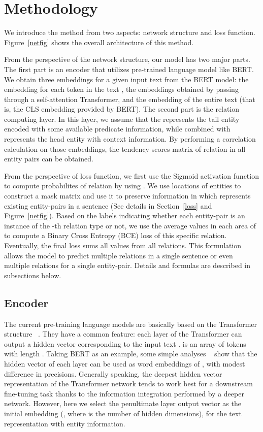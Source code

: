 \documentclass[11pt,a4paper]{article}
\begin{document}
\section{Methodology}
\label{method}

We introduce the method from two aspects: network structure and loss function.
Figure~\ref{netfig} shows the overall architecture of this method. 


From the perspective of the network structure, our model has two major parts. The first part is an encoder that utilizes pre-trained language model like BERT. We obtain three embeddings for a given input text from the BERT model: the embedding   for each token in the text , the embeddings  obtained by passing   through a self-attention Transformer, and the embedding  of the entire text (that is, the CLS embedding provided by BERT). The second part is the relation computing layer. In this layer, we assume that the   represents the tail entity encoded with some available predicate information, while  combined with   represents the head entity with context information. By performing a correlation calculation  on those embeddings, the tendency scores matrix  of relation  in all entity pairs can be obtained. 


From the perspective of loss function, we first use the Sigmoid activation function to compute probabilites  of relation  by using . We use locations of entities to construct a mask matrix  and use it to preserve information in  which represents existing entity-pairs in a sentence (See details in Section~\ref{loss} and Figure~\ref{netfig}). Based on the labels indicating whether each entity-pair is an instance of the -th relation type or not, we use the average values in each area of  to compute a Binary Cross Entropy (BCE) loss of this specific relation. Eventually, the final loss sums all values from all relations. This formulation allows the model to predict multiple relations in a single sentence or even multiple relations for a single entity-pair.
Details and formulas are described in subsections below.


\subsection{Encoder}
The current pre-training language models are basically based on the Transformer structure~\cite{vaswani2017attention} . They have a common feature: each layer of the Transformer can output a hidden vector corresponding to the input text .  is an array of tokens with length . Taking BERT as an example, some simple analyses ~\cite{devlin2018bert} show that the hidden vector of each layer can be used as word embeddings of , with modest difference in precisions. Generally speaking, the deepest hidden vector representation of the Transformer network tends to work best for a downstream fine-tuning task thanks to the information integration performed by a deeper network. However, here we select the penultimate layer output vector as the initial embedding  (, where  is the number of hidden dimensions), for the text representation with entity information.
\end{document}

